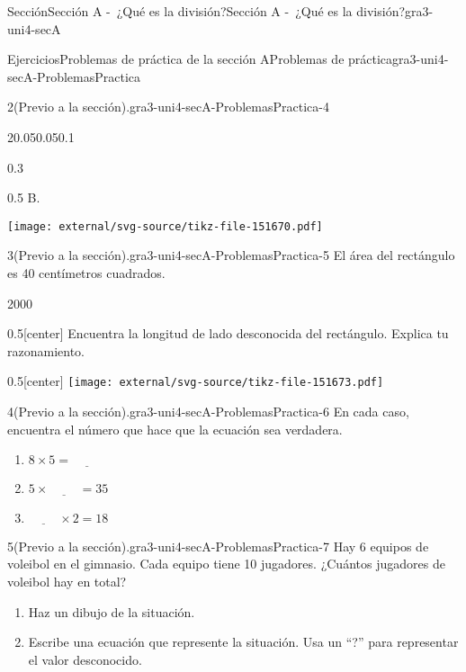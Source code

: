 \documentclass[twoside,14pt,]{extarticle}
\begin{document}
\begin{sectionptx}{Sección}{Sección A -~¿Qué es la división?}{}{Sección A -~¿Qué es la división?}{}{}{gra3-uni4-secA}
\begin{exercises-subsection}{Ejercicios}{Problemas de práctica de la sección A}{}{Problemas de práctica}{}{}{gra3-uni4-secA-ProblemasPractica}
\begin{divisionexercise}{2}{(Previo a la sección).}{}{gra3-uni4-secA-ProblemasPractica-4}
\begin{sidebyside}{2}{0.05}{0.05}{0.1}
\begin{sbspanel}{0.3}
\end{sbspanel}%
\begin{sbspanel}{0.5}%
B.%
\par
\texttt{[image: external/svg-source/tikz-file-151670.pdf]}
\end{sbspanel}%
\end{sidebyside}%
\end{divisionexercise}%
\begin{divisionexercise}{3}{(Previo a la sección).}{}{gra3-uni4-secA-ProblemasPractica-5}%
El área del rectángulo es 40 centímetros cuadrados.%
\begin{sidebyside}{2}{0}{0}{0}%
\begin{sbspanel}{0.5}[center]%
Encuentra la longitud de lado desconocida del rectángulo. Explica tu razonamiento.%
\end{sbspanel}%
\begin{sbspanel}{0.5}[center]%
\texttt{[image: external/svg-source/tikz-file-151673.pdf]}
\end{sbspanel}%
\end{sidebyside}%
\end{divisionexercise}%
\begin{divisionexercise}{4}{(Previo a la sección).}{}{gra3-uni4-secA-ProblemasPractica-6}%
En cada caso, encuentra el número que hace que la ecuación sea verdadera.%
\par
%
\begin{enumerate}[label=(\alph*)]
\item{}\(\displaystyle 8 \times 5 = \underline{\hspace{1cm}}\)%
\item{}\(\displaystyle 5 \times \underline{\hspace{1cm}} = 35\)%
\item{}\(\displaystyle \underline{\hspace{1cm}} \times 2 = 18\)%
\end{enumerate}
%
\end{divisionexercise}%
\begin{divisionexercise}{5}{(Previo a la sección).}{}{gra3-uni4-secA-ProblemasPractica-7}%
Hay 6 equipos de voleibol en el gimnasio. Cada equipo tiene 10 jugadores. ¿Cuántos jugadores de voleibol hay en total?%
\par
%
\begin{enumerate}[label=(\alph*)]
\item{}Haz un dibujo de la situación.%
\item{}Escribe una ecuación que represente la situación. Usa un “?” para representar el valor desconocido.%

\end{enumerate}
\end{divisionexercise}
\end{exercises-subsection}
\end{sectionptx}
\end{document}
